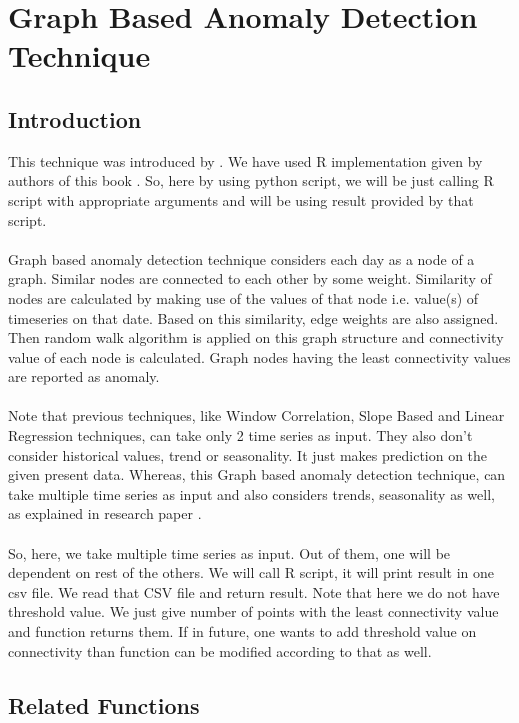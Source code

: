 \chapter{Graph Based Anomaly Detection Technique}
\label{appendix:graphBased}
\section{Introduction}

This technique was introduced by \cite{nasa}. We have used R implementation given by 
authors of this book \cite{nasarbook}. So, here by using python script, we will be just 
calling R script with appropriate arguments and will be using result provided 
by that script.\\
\\
Graph based anomaly detection technique considers each day as a  node of a 
graph. Similar nodes are connected to each other by some weight. Similarity of 
nodes are calculated by making use of the values of that node i.e. value(s) of 
timeseries on that date. Based on this similarity, edge weights are also 
assigned. Then random walk algorithm is applied on this graph structure and 
connectivity value of each node is calculated. Graph nodes having the least 
connectivity values are reported as anomaly.\\
\\
Note that previous techniques, like Window 
Correlation, Slope Based and Linear Regression techniques, can take only 2 time 
series as input. They also don't consider historical values, trend or 
seasonality. It just makes prediction on the given present data. Whereas, this 
Graph based anomaly detection technique, can take multiple time series as input 
and also considers trends, seasonality as well, as explained in research paper 
\cite{nasa}.\\
\\
So, here, we take multiple time series as input. Out of them, one will be 
dependent on rest of the others. We will call R script, it will print result in 
one csv file. We read that CSV file and return result. Note that here we do not 
have threshold value. We just give number of points with the least connectivity 
value and function returns them. If in future, one wants to add threshold value 
on connectivity than function can be modified according to that as well.

\section{Related Functions}

